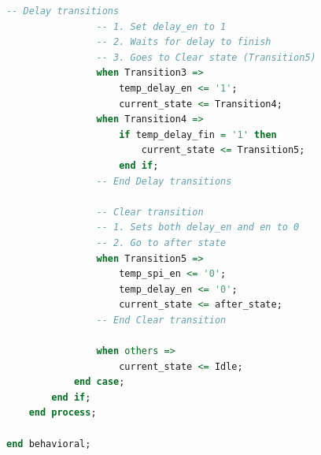 \documentclass[a4paper,12pt]{article}
\begin{document}
\begin{lstlisting}[language=VHDL,basicstyle=\ttfamily\small,frame=single,caption={oled\_ex.vhd}]
                -- Delay transitions
                -- 1. Set delay_en to 1
                -- 2. Waits for delay to finish
                -- 3. Goes to Clear state (Transition5)
                when Transition3 =>
                    temp_delay_en <= '1';
                    current_state <= Transition4;
                when Transition4 =>
                    if temp_delay_fin = '1' then
                        current_state <= Transition5;
                    end if;
                -- End Delay transitions

                -- Clear transition
                -- 1. Sets both delay_en and en to 0
                -- 2. Go to after state
                when Transition5 =>
                    temp_spi_en <= '0';
                    temp_delay_en <= '0';
                    current_state <= after_state;
                -- End Clear transition

                when others =>
                    current_state <= Idle;
            end case;
        end if;
    end process;

end behavioral;
\end{lstlisting}
\end{document}
